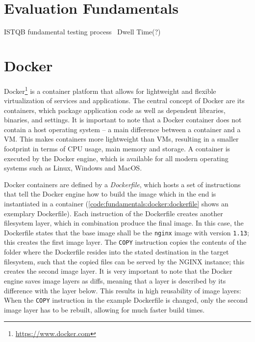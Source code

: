 \section{Evaluation Fundamentals}
\label{sec:fundamentals:evaluation}

ISTQB fundamental testing process~\cite{graham2008foundations}
Dwell Time(?)~\cite{Liu2010}\cite{Kim2014}

\section{Docker}
\label{sec:fundamentals:docker}

Docker\footnote{\url{https://www.docker.com}} is a container platform that allows for lightweight and flexible virtualization of services and applications.
The central concept of Docker are its containers, which package application code as well as dependent libraries, binaries, and settings.
It is important to note that a Docker container does not contain a host operating system -- a main difference between a container and a \ac{VM}.
This makes containers more lightweight than \ac{VM}s, resulting in a smaller footprint in terms of CPU usage, main memory and storage.
A container is executed by the Docker engine, which is available for all modern operating systems such as Linux, Windows and MacOS.

Docker containers are defined by a \emph{Dockerfile}, which hosts a set of instructions that tell the Docker engine how to build the image which in the end is instantiated in a container (\cref{code:fundamentals:docker:dockerfile} shows an exemplary Dockerfile).
Each instruction of the Dockerfile creates another filesystem layer, which in combination produce the final image.
In this case, the Dockerfile states that the base image shall be the \texttt{nginx} image with version \texttt{1.13}; this creates the first image layer.
The \texttt{COPY} instruction copies the contents of the folder where the Dockerfile resides into the stated destination in the target filesystem, such that the copied files can be served by the NGINX instance; this creates the second image layer.
It is very important to note that the Docker engine saves image layers as diffs, meaning that a layer is described by its  difference with the layer below.
This results in high reusability of image layers: When the \texttt{COPY} instruction in the example Dockerfile is changed, only the second image layer has to be rebuilt, allowing for much faster build times.


